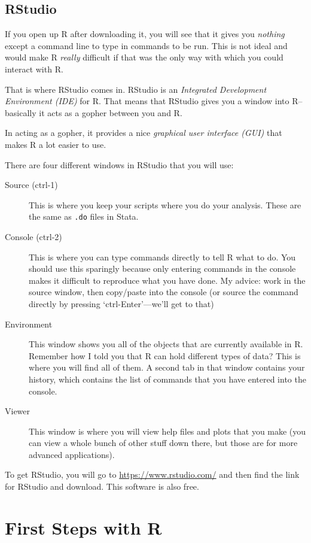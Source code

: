 \documentclass[11pt]{lecturenotes}
\newcommand{\code}[1]{\texttt{#1}}
\begin{document}
\subsection[20]{RStudio}
If you open up R after downloading it, you will see that it gives you \emph{nothing} except a command line to type in commands to be run. This is not ideal and would make R \emph{really} difficult if that was the only way with which you could interact with R. 

That is where RStudio comes in. RStudio is an \emph{Integrated Development Environment (IDE)} for R. That means that RStudio gives you a window into R--basically it acts as a gopher between you and R. 

In acting as a gopher, it provides a nice \emph{graphical user interface (GUI)} that makes R a lot easier to use. 

\slide
There are four different windows in RStudio that you will use: 

\begin{description}
\item[Source (ctrl-1)] This is where you keep your scripts where you do your analysis. These are the same as \code{.do} files in Stata. 
\item[Console (ctrl-2)] This is where you can type commands directly to tell R what to do. You should use this sparingly because only entering commands in the console makes it difficult to reproduce what you have done. My advice: work in the source window, then copy\slash paste into the console (or source the command directly by pressing `ctrl-Enter'---we'll get to that)
\item[Environment] This window shows you all of the objects that are currently available in R. Remember how I told you that R can hold different types of data? This is where you will find all of them. A second tab in that window contains your history, which contains the list of commands that you have entered into the console. 
\item[Viewer] This window is where you will view help files and plots that you make (you can view a whole bunch of other stuff down there, but those are for more advanced applications). 
\end{description}

\slide 
To get RStudio, you will go to \url{https://www.rstudio.com/} and then find the link for RStudio and download. This software is also free. 

\section{First Steps with R}
\end{document}
